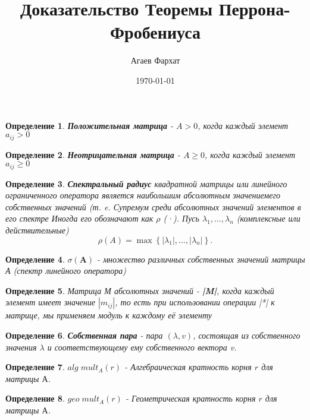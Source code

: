 \documentclass[a4paper,12pt,leqno]{article} %
\author{Агаев Фархат}
\title{Доказательство Теоремы Перрона-Фробениуса}
\date{\today}
\newtheorem{definition}{Определение}
\begin{document}

\maketitle

\begin{definition}
    \textbf{Положительная матрица} - $A > 0$, когда каждый элемент $a_{ij} > 0$
\end{definition}

\begin{definition}
    \textbf{Неотрицательная матрица} - $A \geq 0$, когда каждый элемент $a_{ij} \geq 0$
\end{definition}


\begin{definition}
    \textbf{Спектральный радиус} 
    квадратной матрицы или линейного ограниченного оператора 
    является наибольшим абсолютным значениемего собственных значений 
    (т. e. Супремум среди абсолютных значений элементов в его спектре
    Иногда его обозначают как $\rho$ (·).
    Пусь $\lambda_1, \dotsc, \lambda_n $ (комплексные или действительные)
    \[\rho(A) = \max \left \{ |\lambda_1|, \dotsc, |\lambda_n| \right \}.\]
\end{definition}

\begin{definition}
    $\sigma(\textbf{A}) $ - множество различных собственных значений 
    матрицы А (спектр линейного оператора)
\end{definition}

\begin{definition}
    Матрица М абсолютных значений - \textnormal{\textbf{|M|}}, когда каждый элемент
    имеет значение $|m_{ij}|$, то есть при использовании операции \textnormal{|*|} 
    к матрице, мы применяем модуль к каждому её элементу
\end{definition}

\begin{definition}
    \textbf{Собственная пара} - пара $(\lambda, v)$, состоящая из собственного значения $\lambda$
     и соответствующему ему собственного вектора v.
\end{definition}

\begin{definition}
    \textbf{$alg \; mult_A(r)$} - Алгебраическая кратность корня $r$ для матрицы $А$.
\end{definition}

\begin{definition}
    \textbf{$geo \; mult_A(r)$} - Геометрическая кратность корня $r$ для матрицы $А$.
\end{definition}
\end{document}
